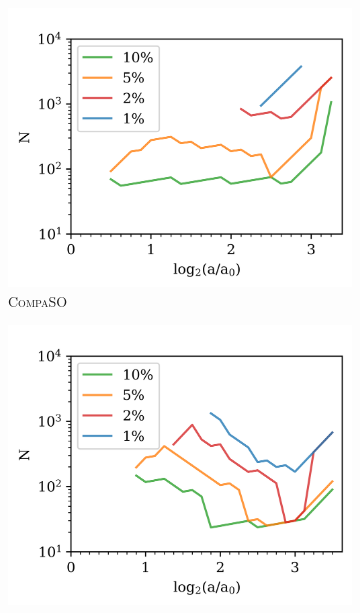 \begin{figure}
\centering
\begin{subfigure}{.49\textwidth}
\centering
\includegraphics[width=\textwidth]{Ch3_Self_Sim/Paper_Plots_gtr20/M200c_gtr20_COMPASO_n15_N_mins_default_convergence_metric_no_concavity_meanD1_050824.png}
\caption{\textsc{CompaSO}}
\end{subfigure}
\hfil
\begin{subfigure}{.49\textwidth}
\centering
\includegraphics[width=\textwidth]{Ch3_Self_Sim/Paper_Plots_gtr20/M200c_gtr20_ROCKSTAR_n15_N_mins_default_convergence_metric_no_concavity_meanD1_050824.png}

\end{subfigure}
\end{figure}
